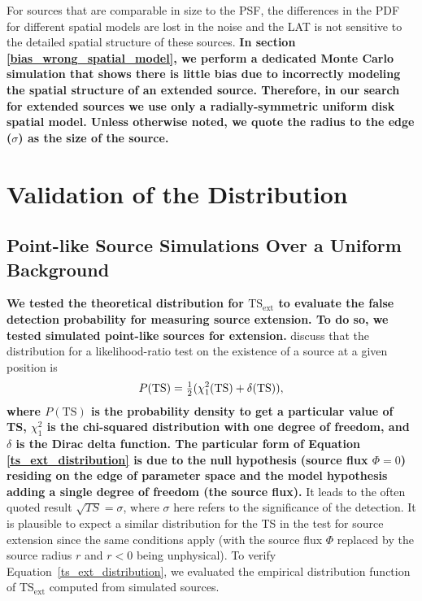 \documentclass[12pt,preprint]{aastex}
\newcommand{\tsext}{{\ensuremath{\text{TS}_{\text{ext}}}}\xspace}
\newcommand{\ts}{\text{TS}\xspace}
\newcommand{\newtext}[1]{{\bfseries \color{red}#1}}
\begin{document}
For sources that are comparable in size to the PSF,
the differences in the PDF for
different spatial models are lost in the noise and the LAT is not sensitive
to the detailed spatial structure of these sources.  
\newtext{In section \ref{bias_wrong_spatial_model}, we perform a dedicated Monte Carlo simulation
that shows there is little bias due to incorrectly modeling the spatial structure
of an extended source.
Therefore, in our search for extended sources we use only a radially-symmetric uniform
disk spatial model. Unless otherwise noted,
we quote the radius to the edge ($\sigma$) as the size of the source.}

\newtext{
\section{Validation of the \ts Distribution}
\label{validate_ts}

\subsection{Point-like Source Simulations Over a Uniform Background}
\label{monte_carlo_validation}

}


\newtext{
We tested the theoretical distribution for \tsext
to evaluate the false detection probability for measuring source extension.
To do so, we tested simulated point-like sources for extension.} 
\cite{mattox_egret}
discuss that the \ts distribution for a likelihood-ratio test
on the existence of a source at a given position is
\begin{equation}\label{ts_ext_distribution}
  P(\ts)=\onehalf(\chi^2_1(\ts)+\delta(\ts)),
\end{equation}
\newtext{
where $P(\ts)$ is the probability density to get a particular value of TS,
$\chi^2_1$ is the chi-squared distribution with one degree of freedom, and
$\delta$ is the Dirac delta function.
The particular form of Equation \ref{ts_ext_distribution} is due to the
null hypothesis (source flux $\Phi=0$) residing on the edge of parameter
space and the model hypothesis adding a single degree of freedom (the source flux).}
It leads to the often quoted result $\sqrt{TS}=\sigma$, where 
$\sigma$ here refers to the significance of the detection. It is plausible
to expect a similar distribution for the TS in the test for
source extension since the same conditions apply (with the source flux
$\Phi$ replaced by the source radius $r$ and $r<0$ being unphysical).
To verify Equation~\ref{ts_ext_distribution}, we evaluated the
empirical distribution function of \tsext computed from simulated sources.
\end{document}
